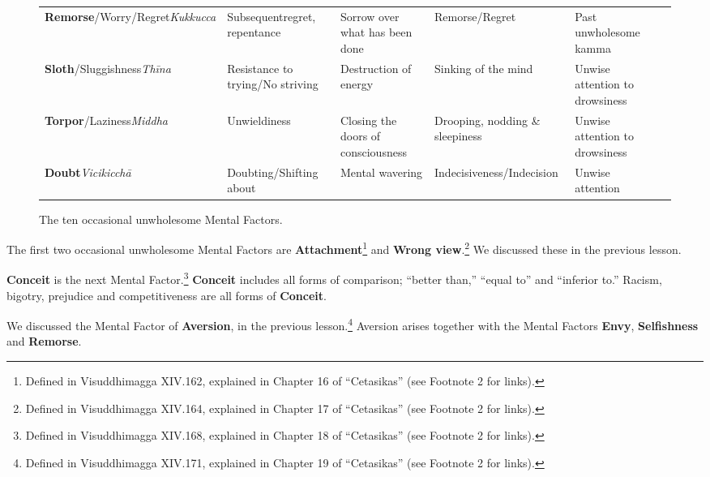 \begin{figure} [H]
\begin{tabular}{P{0.25\textwidth} | C{.185\textwidth} C{0.185\textwidth} C{0.185\textwidth} C{0.195\textwidth} m{0mm}}
\textbf{Remorse}/\newline Worry/Regret\newline \textit{Kukkucca} & Subsequent\newline regret, repentance & Sorrow over what has been done & Remorse/\newline Regret & Past unwholesome kamma &\\[12mm]
\textbf{Sloth}/\newline Sluggishness\newline \textit{Thīna} & Resistance to trying/\newline No striving & Destruction of energy & Sinking of the mind & Unwise attention to drowsiness &\\[12mm]
\textbf{Torpor}/\newline Laziness\newline \textit{Middha} & Unwieldiness & Closing the doors of consciousness & Drooping, nodding \& sleepiness & Unwise attention to drowsiness &\\[12mm]
\textbf{Doubt}\newline \textit{Vicikicchā} & Doubting/\newline Shifting about & Mental wavering & Indecisiveness/\newline Indecision & Unwise attention &\\[12mm]
\bottomrule
\end{tabular}

\caption{The ten occasional unwholesome Mental Factors.}

\end{figure}

\pagebreak

The first two occasional unwholesome Mental Factors are \textbf{Attachment}\footnote{Defined in Visuddhimagga XIV.162, explained in Chapter 16 of “Cetasikas” (see Footnote 2 for links).} and \textbf{Wrong view}.\footnote{Defined in Visuddhimagga XIV.164, explained in Chapter 17 of “Cetasikas” (see Footnote 2 for links).} We discussed these in the previous lesson.

\textbf{Conceit} is the next Mental Factor.\footnote{Defined in Visuddhimagga XIV.168, explained in Chapter 18 of “Cetasikas” (see Footnote 2 for links).} \textbf{Conceit} includes all forms of comparison; “better than,” “equal to” and “inferior to.” Racism, bigotry, prejudice and competitiveness are all forms of \textbf{Conceit}.

We discussed the Mental Factor of \textbf{Aversion}, in the previous lesson.\footnote{Defined in Visuddhimagga XIV.171, explained in Chapter 19 of “Cetasikas” (see Footnote 2 for links).} Aversion arises together with the Mental Factors \textbf{Envy}, \textbf{Selfishness} and \textbf{Remorse}.

